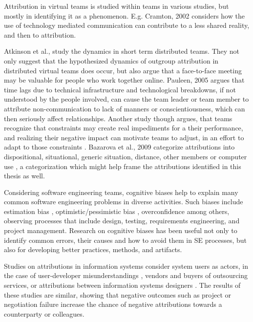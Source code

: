 \documentclass[a4paper]{article}
\begin{document}
Attribution in virtual teams is studied within teams in various studies, but mostly in identifying it as a phenomenon. E.g. Cramton, 2002 \cite{Crampton2001} considers how the use of technology mediated communication can contribute to a less shared reality, and then to attribution. 

Atkinson et al., study the dynamics in short term distributed teams. They not only suggest that the hypothesized dynamics of outgroup attribution in distributed virtual teams does occur, but also argue that a face-to-face meeting may be valuable for people who work together online. Pauleen, 2005 \cite{Pauleen2005} argues that time lags due to technical infrastructure and technological breakdowns, if not understood by the people involved, can cause the team leader or team member to attribute non-communication to lack of manners or conscientiousness, which can then seriously affect relationships. Another study though argues, that teams recognize that constraints
may create real impediments for a their performance, and realizing their negative
impact can motivate teams to adjust, in an effort to adapt to those constraints \cite{Bazarova2012}. Bazarova et al., 2009 categorize attributions into dispositional, situational, generic situation, distance, other members or computer use \cite{Bazarova2009}, a categorization which might help frame the attributions identified in this thesis as well.

Considering software engineering teams, cognitive biases help to explain many common software engineering problems in diverse activities. Such biases include estimation bias \cite{Jorgensen2012}, optimistic/pessimistic bias \cite{Fleischmann2014}, overconfidence among others, observing processes that include design, testing, requirements engineering, and project management. Research on cognitive biases has been useful not only to identify common errors, their causes and how to avoid them in SE processes, but also for developing better practices, methods, and artifacts. 

Studies on attributions in information systems consider system users as actors, in the case of user-developer misunderstandings \cite{Snead2014}, vendors and buyers of outsourcing services\cite{Rouse2007}, or attributions between information systems designers \cite{Peterson2002}. The results of these studies are similar, showing that negative outcomes such as project or negotiation failure increase the chance of negative attributions towards a counterparty or colleagues. 
\end{document}

